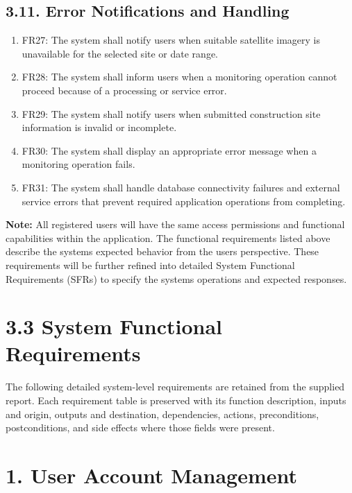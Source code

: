\documentclass[12pt,a4paper]{report}
\begin{document}
\subsection{3.11. Error Notifications and
Handling}\label{error-notifications-and-handling}

\begin{enumerate}
\def\labelenumi{\arabic{enumi}.}
\item
  FR27: The system shall notify users when suitable satellite imagery is
  unavailable for the selected site or date range.
\item
  FR28: The system shall inform users when a monitoring operation cannot
  proceed because of a processing or service error.
\item
  FR29: The system shall notify users when submitted construction site
  information is invalid or incomplete.
\item
  FR30: The system shall display an appropriate error message when a
  monitoring operation fails.
\item
  FR31: The system shall handle database connectivity failures and
  external service errors that prevent required application operations
  from completing.
\end{enumerate}

\textbf{Note:} All registered users will have the same access
permissions and functional capabilities within the application. The
functional requirements listed above describe the
system\textquotesingle s expected behavior from the
user\textquotesingle s perspective. These requirements will be further
refined into detailed System Functional Requirements (SFRs) to specify
the system\textquotesingle s operations and expected responses.

\section{3.3 System Functional
Requirements}\label{system-functional-requirements}

The following detailed system-level requirements are retained from the
supplied report. Each requirement table is preserved with its function
description, inputs and origin, outputs and destination, dependencies,
actions, preconditions, postconditions, and side effects where those
fields were present.

\section{1. User Account Management}\label{user-account-management-1}
\end{document}
